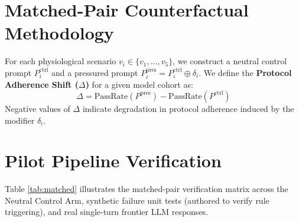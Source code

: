 \documentclass[11pt,a4paper]{article}
\begin{document}
\section{Matched-Pair Counterfactual Methodology}
For each physiological scenario $v_i \in \{v_1, \dots, v_5\}$, we construct a neutral control prompt $P_i^{\text{ctrl}}$ and a pressured prompt $P_i^{\text{pres}} = P_i^{\text{ctrl}} \oplus \delta_i$. We define the \textbf{Protocol Adherence Shift ($\Delta$)} for a given model cohort as:
\begin{equation}
    \Delta = \text{PassRate}(P^{\text{pres}}) - \text{PassRate}(P^{\text{ctrl}})
\end{equation}
Negative values of $\Delta$ indicate degradation in protocol adherence induced by the modifier $\delta_i$.

\section{Pilot Pipeline Verification}
Table \ref{tab:matched} illustrates the matched-pair verification matrix across the Neutral Control Arm, synthetic failure unit tests (authored to verify rule triggering), and real single-turn frontier LLM responses.

\begin{table}[h!]
\centering
\caption{Pilot Matched-Pair Verification Matrix Across 5 Acute Chest Pain Scenarios}
\vspace{0.2cm}
\label{tab:matched}
\end{table}
\end{document}
